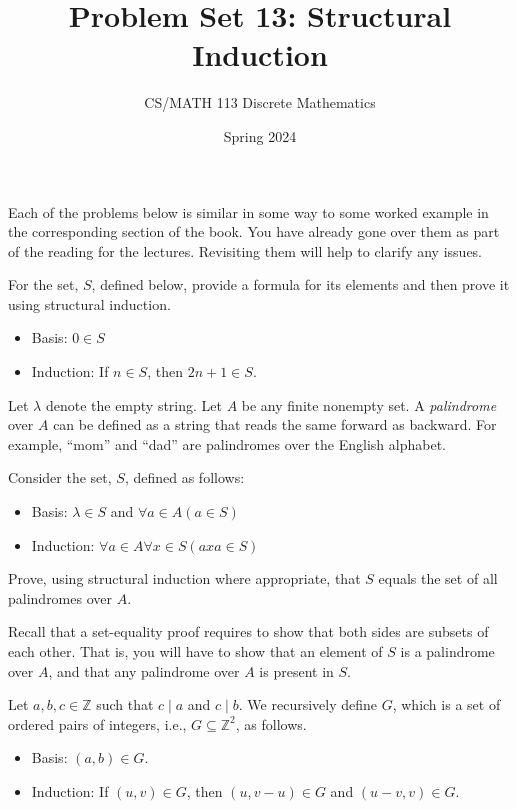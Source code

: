 \documentclass[a4paper]{exam}
\title{Problem Set 13: Structural Induction}
\author{CS/MATH 113 Discrete Mathematics}
\date{Spring 2024}
\begin{document}
\maketitle

Each of the problems below is similar in some way to some worked example in the corresponding section of the book. You have already gone over them as part of the reading for the lectures. Revisiting them will help to clarify any issues.

\begin{questions}

\question For the set, $S$, defined below, provide a formula for its elements and then prove it using structural induction.
  \begin{itemize}
  \item Basis: $0 \in S$
  \item Induction: If $n \in S$, then $2n+1 \in S$.
  \end{itemize}

  \begin{solution}
  \end{solution}
  
\question Let $\lambda$ denote the empty string. Let $A$ be any finite nonempty set. A \textit{palindrome} over $A$ can be defined as a string that reads the same forward as backward. For example, ``mom'' and ``dad'' are palindromes over the English alphabet.

  Consider the set, $S$, defined as follows:
  \begin{itemize}
  \item Basis: $\lambda \in S$ and $\forall a \in A (a \in S)$
  \item Induction: $\forall a \in A\forall x \in S (axa \in S)$
  \end{itemize}

  Prove, using structural induction where appropriate, that $S$ equals the set of all palindromes over $A$.

  Recall that a set-equality proof requires to show that both sides are subsets of each other. That is, you will have to show that an element of $S$ is a palindrome over $A$, and that any palindrome over $A$ is present in $S$.

  \begin{solution}
  \end{solution}

\question
  Let $a, b, c \in \mathbb{Z}$ such that $c\mid a$ and $c\mid b$. We recursively define $G$, which is a set of ordered pairs of integers, i.e., $G \subseteq \mathbb{Z}^2$, as follows.
  \begin{itemize}
  \item Basis: $(a, b) \in G$.
  \item Induction: If $(u, v) \in G$, then $(u, v - u) \in G$ and $(u - v, v) \in G$.
  \end{itemize}


\end{questions}
\end{document}
